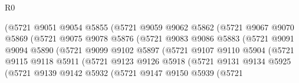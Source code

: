 \begin{lexlean}{R0}
\begin{coremodule}
                              (@5721
                                @9051
                                @9054
                                @5855
                                (@5721
                                  @9059
                                  @9062
                                  @5862
                                  (@5721
                                    @9067
                                    @9070
                                    @5869
                                    (@5721
                                      @9075
                                      @9078
                                      @5876
                                      (@5721
                                        @9083
                                        @9086
                                        @5883
                                        (@5721
                                          @9091
                                          @9094
                                          @5890
                                          (@5721
                                            @9099
                                            @9102
                                            @5897
                                            (@5721
                                              @9107
                                              @9110
                                              @5904
                                              (@5721
                                                @9115
                                                @9118
                                                @5911
                                                (@5721
                                                  @9123
                                                  @9126
                                                  @5918
                                                  (@5721
                                                    @9131
                                                    @9134
                                                    @5925
                                                    (@5721
                                                      @9139
                                                      @9142
                                                      @5932
                                                      (@5721
                                                        @9147
                                                        @9150
                                                        @5939
                                                        (@5721

\end{coremodule}
\end{lexlean}
